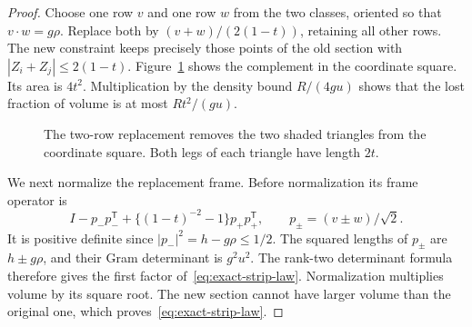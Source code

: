 \documentclass[11pt,a4paper]{article}
\theoremstyle{remark}\newtheorem{remark}[theorem]{Remark}
\numberwithin{equation}{section}
\begin{document}
\begin{proof}
Choose one row \(v\) and one row \(w\) from the two classes, oriented
so that \(v\cdot w=g\rho\). Replace both by \((v+w)/(2(1-t))\),
retaining all other rows. The new constraint keeps precisely those
points of the old section with \(|Z_i+Z_j|\le2(1-t)\).
Figure~\ref{fig:two-corners} shows the complement in the coordinate
square. Its area is \(4t^2\). Multiplication by the density bound
\(R/(4gu)\) shows that the lost fraction of volume is at most
\(Rt^2/(gu)\).

\begin{figure}[htbp]
\centering
\begin{minipage}[c]{.28\linewidth}
\centering
{}
\end{minipage}\hfill
\begin{minipage}[c]{.70\linewidth}
\caption{The two-row replacement removes the two shaded triangles
from the coordinate square. Both legs of each triangle have length
\(2t\).}\label{fig:two-corners}
\end{minipage}
\end{figure}

We next normalize the replacement frame. Before normalization its
frame operator is
\[
 I-p_-p_-^{\mathsf T}+\{(1-t)^{-2}-1\}p_+p_+^{\mathsf T},
 \qquad p_\pm=(v\pm w)/\sqrt2 .
\]
It is positive definite since \(|p_-|^2=h-g\rho\le1/2\).
The squared lengths of \(p_\pm\) are \(h\pm g\rho\), and their Gram
determinant is \(g^2u^2\). The rank-two determinant formula therefore
gives the first factor of~\eqref{eq:exact-strip-law}. Normalization
multiplies volume by its square root. The new section cannot have larger
volume than the original one, which proves~\eqref{eq:exact-strip-law}.


\end{proof}
\end{document}
